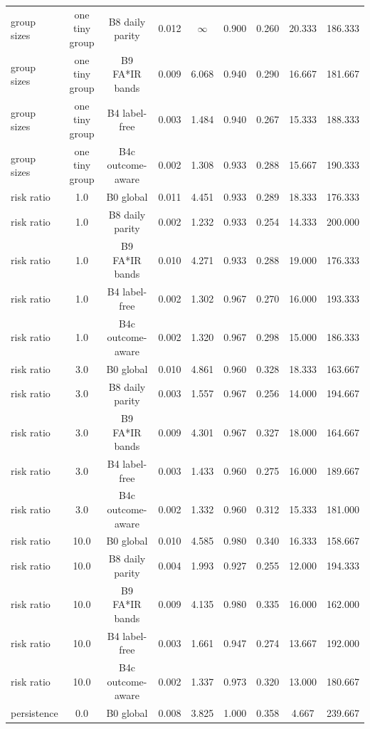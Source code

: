 \documentclass[10pt,onecolumn,letterpaper]{article}
\begin{document}
\begin{table}[!t]
{\begin{tabular}{lcccccccc}
group sizes & one tiny group & B8 daily parity & 0.012 & $\infty$ & 0.900 & 0.260 & 20.333 & 186.333 \\
group sizes & one tiny group & B9 FA*IR bands & 0.009 & 6.068 & 0.940 & 0.290 & 16.667 & 181.667 \\
group sizes & one tiny group & B4 label-free & 0.003 & 1.484 & 0.940 & 0.267 & 15.333 & 188.333 \\
group sizes & one tiny group & B4c outcome-aware & 0.002 & 1.308 & 0.933 & 0.288 & 15.667 & 190.333 \\
risk ratio & 1.0 & B0 global & 0.011 & 4.451 & 0.933 & 0.289 & 18.333 & 176.333 \\
risk ratio & 1.0 & B8 daily parity & 0.002 & 1.232 & 0.933 & 0.254 & 14.333 & 200.000 \\
risk ratio & 1.0 & B9 FA*IR bands & 0.010 & 4.271 & 0.933 & 0.288 & 19.000 & 176.333 \\
risk ratio & 1.0 & B4 label-free & 0.002 & 1.302 & 0.967 & 0.270 & 16.000 & 193.333 \\
risk ratio & 1.0 & B4c outcome-aware & 0.002 & 1.320 & 0.967 & 0.298 & 15.000 & 186.333 \\
risk ratio & 3.0 & B0 global & 0.010 & 4.861 & 0.960 & 0.328 & 18.333 & 163.667 \\
risk ratio & 3.0 & B8 daily parity & 0.003 & 1.557 & 0.967 & 0.256 & 14.000 & 194.667 \\
risk ratio & 3.0 & B9 FA*IR bands & 0.009 & 4.301 & 0.967 & 0.327 & 18.000 & 164.667 \\
risk ratio & 3.0 & B4 label-free & 0.003 & 1.433 & 0.960 & 0.275 & 16.000 & 189.667 \\
risk ratio & 3.0 & B4c outcome-aware & 0.002 & 1.332 & 0.960 & 0.312 & 15.333 & 181.000 \\
risk ratio & 10.0 & B0 global & 0.010 & 4.585 & 0.980 & 0.340 & 16.333 & 158.667 \\
risk ratio & 10.0 & B8 daily parity & 0.004 & 1.993 & 0.927 & 0.255 & 12.000 & 194.333 \\
risk ratio & 10.0 & B9 FA*IR bands & 0.009 & 4.135 & 0.980 & 0.335 & 16.000 & 162.000 \\
risk ratio & 10.0 & B4 label-free & 0.003 & 1.661 & 0.947 & 0.274 & 13.667 & 192.000 \\
risk ratio & 10.0 & B4c outcome-aware & 0.002 & 1.337 & 0.973 & 0.320 & 13.000 & 180.667 \\
persistence & 0.0 & B0 global & 0.008 & 3.825 & 1.000 & 0.358 & 4.667 & 239.667 \\

\end{tabular}}
\end{table}
\end{document}
